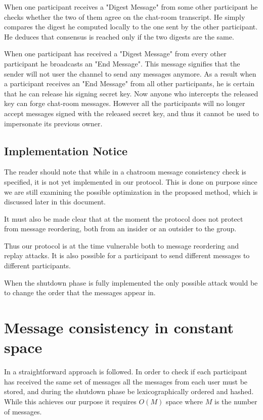 \documentclass[12pt,titlepage,a4paper]{article}
\begin{document}
When one participant receives a "Digest Message" from some other participant he checks whether the two of them agree on the chat-room transcript.
He simply compares the digest he computed locally to the one sent by the other participant.
He deduces that consensus is reached only if the two digests are the same.

When one participant has received a "Digest Message" from every other participant he broadcasts an "End Message".
This message signifies that the sender will not user the channel to send any messages anymore.
As a result when a participant receives an "End Message" from all other participants, he is certain that he can release his signing secret key.
Now anyone who intercepts the released key can forge chat-room messages.
However all the participants will no longer accept messages signed with the released secret key, and thus it cannot be used to impersonate its previous owner.
\subsection{Implementation Notice}

The reader should note that while in \cite{mpotr} a chatroom message consistency
check is specified, it is not yet implemented in our protocol. This is done on
purpose since we are still examining the possible optimization in the proposed
method, which is discussed later in this document.

It must also be made clear that at the moment the protocol does not protect
from message reordering, both from an insider or an outsider to the group.

Thus our protocol is at the time vulnerable both to message reordering and replay
attacks. It is also possible for a participant to send different messages to
different participants.

When the shutdown phase is fully implemented the only possible attack would be
to change the order that the messages appear in.

\section{Message consistency in constant space}

In \cite{mpotr} a straightforward approach is followed. In order to check if
each participant has received the same set of messages all the messages from
each user must be stored, and during the shutdown phase be lexicographically
ordered and hashed. While this achieves our purpose it requires $O(M)$ space
where $M$ is the number of messages.
\end{document}
